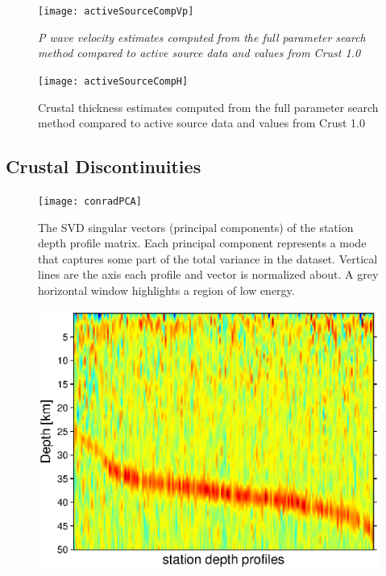 \documentclass[draft, 12pt]{article}
\begin{document}
\begin{figure}
  \centering
  \texttt{[image: activeSourceCompVp]}
  \caption{\it{P} wave velocity estimates computed from the full parameter search method compared to active source data and values from Crust 1.0}
  \label{fig:activeVp}
\end{figure}

\begin{figure}
  \centering
  \texttt{[image: activeSourceCompH]}
  \caption{Crustal thickness estimates computed from the full parameter search method compared to active source data and values from Crust 1.0}
  \label{fig:activeH}
\end{figure}






\subsection{Crustal Discontinuities} \label{section:discontinuities}

\begin{figure}
  \centering
  \texttt{[image: conradPCA]}
  \caption{The SVD singular vectors (principal components) of the station depth profile matrix. Each principal component represents a mode that captures some part of the total variance in the dataset. Vertical lines are the axis each profile and vector is normalized about. A grey horizontal window highlights a region of low energy.}
  \label{fig:conradPCA}
\end{figure}

\begin{figure}
  \centering
  \includegraphics[width=\textwidth]{discontinuity}
  \caption{}
  \label{fig:disc}
\end{figure}
\end{document}
